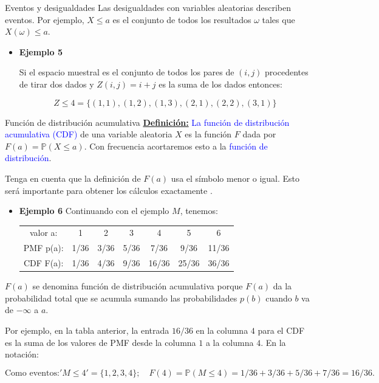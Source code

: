 \documentclass[10pt]{beamer}
\begin{document}
\begin{frame}{Eventos y desigualdades}
Las desigualdades con variables aleatorias describen eventos. Por ejemplo, $X \leq  a$ es el conjunto de todos los resultados $\omega$ tales que $X(\omega) \leq a$.

\vspace{0.5cm}

\begin{itemize}
	\item \small {\textbf{Ejemplo 5}

Si el espacio muestral es el conjunto de todos los pares de $(i, j)$ procedentes de tirar dos dados y $Z(i, j) = i + j$ es la suma de los dados entonces:

\[
Z \leq 4 = \{(1, 1), (1, 2), (1, 3), (2, 1), (2, 2), (3, 1) \}
\]
	}
\end{itemize}
\end{frame}
\begin{frame}{Funci\'on de distribuci\'on acumulativa}
\textbf{\small{\underline{Definici\'on:}}} \textcolor{blue}{ La funci\'on de distribuci\'on acumulativa (CDF)} de una variable aleatoria $X$ es la funci\'on $F$ dada por $F(a) = \mathbb{P}(X \leq a)$. Con frecuencia acortaremos esto a la \textcolor{blue}{funci\'on de distribuci\'on}.

Tenga en cuenta que la definici\'on de $F(a)$ usa el s\'imbolo menor o igual. Esto ser\'a importante para obtener los c\'alculos exactamente .


\begin{itemize}
\item \small {\textbf{Ejemplo 6} Continuando con el ejemplo $M$, tenemos:
		
\begin{table}[]
	\centering
	\begin{tabular}{ccccccc}
		valor a:   & 1    & 2    & 3    & 4    & 5    & 6     \\
		PMF   p(a): & 1/36 & 3/36 & 5/36 & 7/36 & 9/36 & 11/36 \\
		CDF   F(a): & 1/36 & 4/36 & 9/36 & 16/36 & 25/36 & 36/36	
	\end{tabular}
\end{table}
}
\end{itemize}

\vspace{0.3cm}

\scriptsize{$F(a)$ se denomina funci\'on de distribuci\'on acumulativa porque $F(a)$ da la probabilidad total que se acumula sumando las probabilidades $p(b)$ cuando $b$ va de $-\infty$ a $a$.
	
Por ejemplo, en la tabla anterior, la entrada $16/36$ en la columna $4$ para el CDF es la suma de los valores  de PMF desde  la columna $1$ a la columna $4$. En la notaci\'on:

\[
\text{Como eventos:} 'M \leq 4' = \{1, 2, 3, 4\}; \quad F(4) = \mathbb{P}(M \leq 4) = 1/36+3/36+5/36+7/36 = 16/36.
\]
}

\end{frame}
\end{document}
